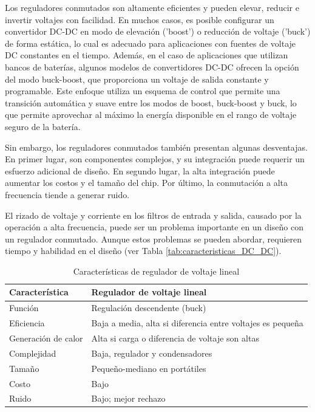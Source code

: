 Los reguladores conmutados son altamente eficientes y pueden elevar, reducir e invertir voltajes con facilidad. En muchos casos, es posible configurar un convertidor DC-DC en modo de elevación ('boost') o reducción de voltaje ('buck') de forma estática, lo cual es adecuado para aplicaciones con fuentes de voltaje DC constantes en el tiempo. Además, en el caso de aplicaciones que utilizan bancos de baterías, algunos modelos de convertidores DC-DC ofrecen la opción del modo buck-boost, que proporciona un voltaje de salida constante y programable. Este enfoque utiliza un esquema de control que permite una transición automática y suave entre los modos de boost, buck-boost y buck, lo que permite aprovechar al máximo la energía disponible en el rango de voltaje seguro de la batería.

Sin embargo, los reguladores conmutados también presentan algunas desventajas. En primer lugar, son componentes complejos, y su integración puede requerir un esfuerzo adicional de diseño. En segundo lugar, la alta integración puede aumentar los costos y el tamaño del chip. Por último, la conmutación a alta frecuencia tiende a generar ruido.

El rizado de voltaje y corriente en los filtros de entrada y salida, causado por la operación a alta frecuencia, puede ser un problema importante en un diseño con un regulador conmutado. Aunque estos problemas se pueden abordar, requieren tiempo y habilidad en el diseño (ver Tabla \ref{tab:caracteristicas_DC_DC}).



\begin{table}[h]
    \centering
    \caption{Características de regulador de voltaje lineal}
    \label{tab:caracteristicas_LDO}
    \begin{tabular}{ll}
        \toprule
        Característica & Regulador de voltaje lineal \\ 
        \midrule
        Función & Regulación descendente (buck) \\ 
        Eficiencia & Baja a media, alta si diferencia entre voltajes es pequeña \\ 
        Generación de calor & Alta si carga o diferencia de voltaje son altas \\ 
        Complejidad & Baja, regulador y condensadores \\ 
        Tamaño & Pequeño-mediano en portátiles \\ 
        Costo & Bajo \\ 
        Ruido & Bajo; mejor rechazo \\ 
        \bottomrule
    \end{tabular}
\end{table}

